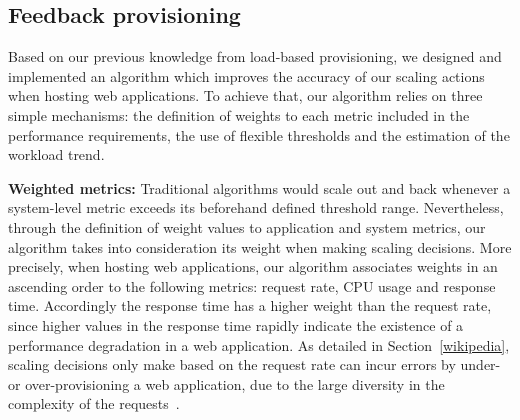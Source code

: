 





\subsection{Feedback provisioning}


Based on our previous knowledge from load-based provisioning, we designed and implemented an algorithm which improves the accuracy of our scaling actions when hosting web applications. To achieve that, our algorithm relies on three simple mechanisms: the definition of weights to each metric included in the performance requirements, the use of flexible thresholds and the estimation of the workload trend. 

\vspace{2mm}

\textbf{Weighted metrics:} Traditional algorithms would scale out and back whenever a system-level metric exceeds its beforehand defined threshold range. Nevertheless,  through the definition of weight values to application and system metrics, our algorithm takes into consideration its weight when making scaling decisions. More precisely, when hosting web applications, our algorithm associates weights in an ascending order to the following metrics: request rate, CPU usage and response time. Accordingly the response time has a higher weight than the request rate, since higher values in the response time rapidly indicate the existence of a performance degradation in a web application. As detailed in Section~\ref{wikipedia}, scaling decisions only make based on the request rate can incur errors by under- or over-provisioning  a web application, due to the large diversity in the complexity of the requests~\cite{singh_autonomic_2010}.

